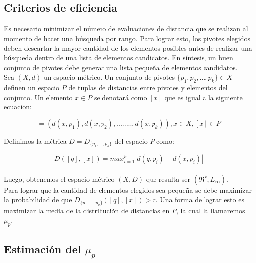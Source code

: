 \subsection{Criterios de eficiencia}

Es necesario minimizar el n\'umero de evaluaciones de distancia que se realizan al momento de hacer una b\'usqueda por rango. Para lograr esto, los pivotes elegidos deben descartar la mayor cantidad de los elementos posibles antes de realizar una b\'usqueda dentro de una lista de elementos candidatos. En s\'intesis, un buen conjunto de pivotes debe generar una lista peque\~na de elementos candidatos.\\

Sea $(X,d)$ un espacio m\'etrico. Un conjunto de pivotes $\{p_1,p_2,...,p_k\} \in X$ definen un espacio $P$ de tuplas de distancias entre pivotes y elementos del conjunto. Un elemento $x \in P$ se denotar\'a como $[x]$ que es igual a la siguiente ecuaci\'on:

\begin{equation}
[x] = (d(x,p_1),d(x,p_2),........,d(x,p_k)), x \in X, [x] \in P
\label{eq-mapeo}
\end{equation}

\noindent Definimos la m\'etrica $D = D_{\{p_1,...,p_k\}}$ del espacio $P$ como:

\begin{equation}
D([q],[x]) = max_{i=1}^k |d(q,p_i) - d(x,p_i)|
\label{eq-met-esp}
\end{equation}
\\
Luego, obtenemos el espacio m\'etrico $(X,D)$ que resulta ser $(\Re^k, L_{\infty})$. \\


Para lograr que la cantidad de elementos elegidos sea peque\~na se debe maximizar la probabilidad de que $D_{\{p_1,...,p_k\}}([q],[x]) > r$. Una forma de lograr esto es maximizar la media de la distribuci\'on de distancias en $P$, la cual la llamaremos $\mu_p$.
 
\subsection{Estimaci\'on del $\mu_p$}

